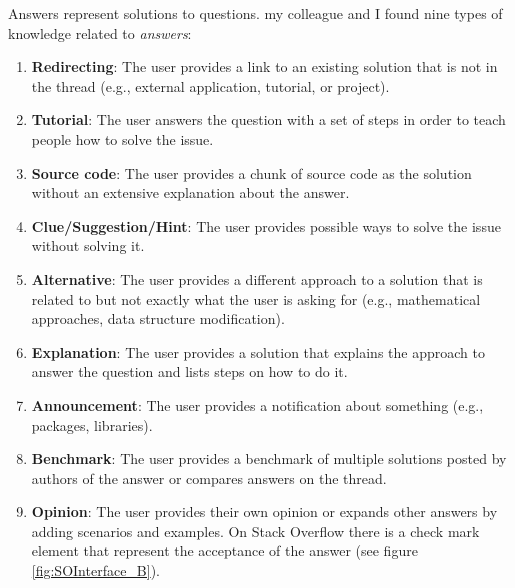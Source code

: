 \documentclass{sig-alternate-05-2015}
\begin{document}
	Answers represent solutions to questions.
	my colleague and I found nine types of knowledge related to \textit{answers}:
	\begin{enumerate}[\bfseries (1)]
	\item \textbf{Redirecting}: The user provides a link to an existing solution that is not in the thread (e.g., external application, tutorial, or project).
	\item \textbf{Tutorial}: The user answers the question with a set of steps in order to teach people how to solve the issue.
	\item \textbf{Source code}: The user provides a chunk of source code as the solution without an extensive explanation about the answer.
	\item \textbf{Clue/Suggestion/Hint}: The user provides possible ways to solve the issue without solving it.
	\item \textbf{Alternative}: The user provides a different approach to a solution that is related to but not exactly what the user is asking for (e.g., mathematical approaches, data structure modification).
	\item \textbf{Explanation}: The user provides a solution that explains the approach to answer the question and lists steps on how to do it.
	\item \textbf{Announcement}: The user provides a notification about something (e.g., packages, libraries).
	\item \textbf{Benchmark}: The user provides a benchmark of multiple solutions posted by authors of the answer or compares answers on the thread.
	\item \textbf{Opinion}: The user provides their own opinion or expands other answers by adding scenarios and examples.
    On Stack Overflow there is a check mark element that represent the acceptance of the answer (see figure \ref{fig:SOInterface_B}).
	\end{enumerate}


\end{document}

